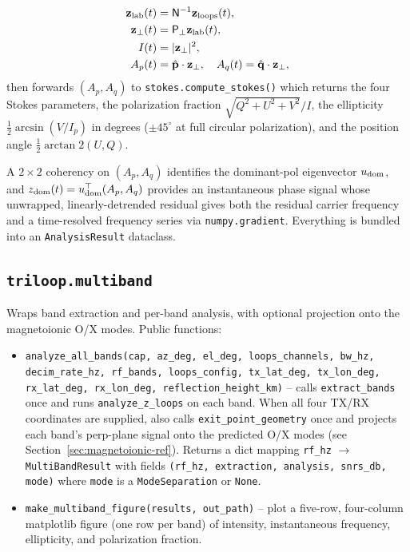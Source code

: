 \documentclass[11pt]{article}
\begin{document}
\begin{align}
  \mathbf z_{\rm lab}(t) &= \mathsf{N}^{-1}\mathbf z_{\rm loops}(t),\\
  \mathbf z_\perp(t) &= \mathsf{P}_\perp \mathbf z_{\rm lab}(t),\\
  I(t) &= |\mathbf z_\perp|^2,\\
  A_p(t) &= \hat{\mathbf p}\cdot\mathbf z_\perp,\quad
  A_q(t) = \hat{\mathbf q}\cdot\mathbf z_\perp,
\end{align}
then forwards $(A_p, A_q)$ to \texttt{stokes.compute\_stokes()} which
returns the four Stokes parameters, the polarization fraction
$\sqrt{Q^2+U^2+V^2}/I$, the ellipticity $\frac12 \arcsin(V/I_p)$ in
degrees ($\pm 45^\circ$ at full circular polarization), and the
position angle $\frac12 \arctan2(U, Q)$.

A $2\times 2$ coherency on $(A_p, A_q)$ identifies the dominant-pol
eigenvector $u_{\rm dom}$, and
$z_{\rm dom}(t) = u_{\rm dom}^\top (A_p, A_q)$ provides an instantaneous
phase signal whose unwrapped, linearly-detrended residual gives both
the residual carrier frequency and a time-resolved frequency series via
\texttt{numpy.gradient}.  Everything is bundled into an
\texttt{AnalysisResult} dataclass.

\subsection{\texttt{triloop.multiband}}

Wraps band extraction and per-band analysis, with optional projection
onto the magnetoionic O/X modes.  Public functions:

\begin{itemize}\itemsep=2pt
\item \texttt{analyze\_all\_bands(cap, az\_deg, el\_deg,
      loops\_channels, bw\_hz, decim\_rate\_hz, rf\_bands, loops\_config,
      tx\_lat\_deg, tx\_lon\_deg, rx\_lat\_deg, rx\_lon\_deg,
      reflection\_height\_km)}
      -- calls \texttt{extract\_bands} once and runs
      \texttt{analyze\_z\_loops} on each band.  When all four TX/RX
      coordinates are supplied, also calls
      \texttt{exit\_point\_geometry} once and projects each band's
      perp-plane signal onto the predicted O/X modes (see
      Section~\ref{sec:magnetoionic-ref}).  Returns a dict mapping
      \texttt{rf\_hz} $\to$ \texttt{MultiBandResult} with fields
      \texttt{(rf\_hz, extraction, analysis, snrs\_db, mode)} where
      \texttt{mode} is a \texttt{ModeSeparation} or \texttt{None}.
\item \texttt{make\_multiband\_figure(results, out\_path)} -- plot a
      five-row, four-column matplotlib figure (one row per band) of
      intensity, instantaneous frequency, ellipticity, and polarization
      fraction.
\end{itemize}
\end{document}

